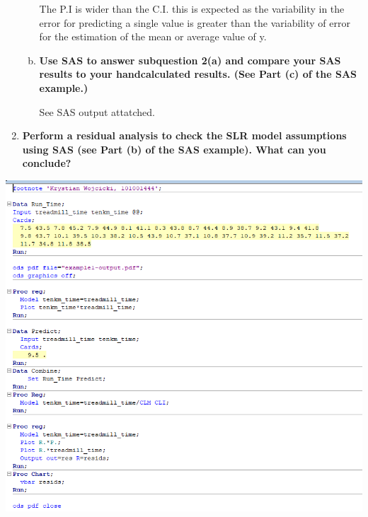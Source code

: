 \documentclass{article}
\begin{document}
\begin{enumerate}[1.]
\begin{enumerate}[(a)]
The P.I is wider than the C.I. this is expected as the variability in the error for predicting a single value is greater than the variability of error for the estimation of the mean or average value of y.

\item \textbf{Use SAS to answer subquestion 2(a) and compare your SAS results to your handcalculated results. (See Part (c) of the SAS example.)}

See SAS output attatched.

\end{enumerate}

\item \textbf{Perform a residual analysis to check the SLR model assumptions using SAS (see Part (b) of
the SAS example). What can you conclude?}

\end{enumerate}

\begin{center}
	\includegraphics{a2_sascode}
\end{center}
\end{document}
